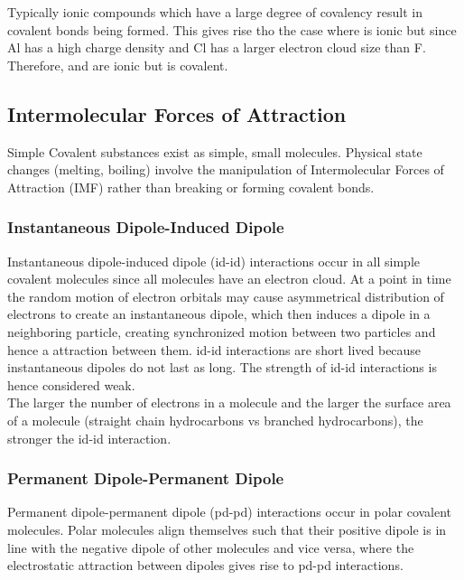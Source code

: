 \documentclass[../main]{subfiles}
\begin{document}
	Typically ionic compounds which have a large degree of covalency result in covalent bonds being formed. This gives rise tho the case where  is ionic but  since Al has a high charge density and Cl has a larger electron cloud size than F. Therefore,  and  are ionic but  is covalent.

	\subsection{Intermolecular Forces of Attraction}

	Simple Covalent substances exist as simple, small molecules. Physical state changes (melting, boiling) involve the manipulation of Intermolecular Forces of Attraction (IMF) rather than breaking or forming covalent bonds.

	\subsubsection{Instantaneous Dipole-Induced Dipole}

	Instantaneous dipole-induced dipole (id-id) interactions occur in all simple covalent molecules since all molecules have an electron cloud. At a point in time the random motion of electron orbitals may cause asymmetrical distribution of electrons to create an instantaneous dipole, which then induces a dipole in a neighboring particle, creating synchronized motion between two particles and hence a attraction between them. id-id interactions are short lived because instantaneous dipoles do not last as long. The strength of id-id interactions is hence considered weak. \\

	The larger the number of electrons in a molecule and the larger the surface area of a molecule (straight chain hydrocarbons vs branched hydrocarbons), the stronger the id-id interaction. \\

	\subsubsection{Permanent Dipole-Permanent Dipole}

	Permanent dipole-permanent dipole (pd-pd) interactions occur in polar covalent molecules. Polar molecules align themselves such that their positive dipole is in line with the negative dipole of other molecules and vice versa, where the electrostatic attraction between dipoles gives rise to pd-pd interactions. \\
\end{document}
